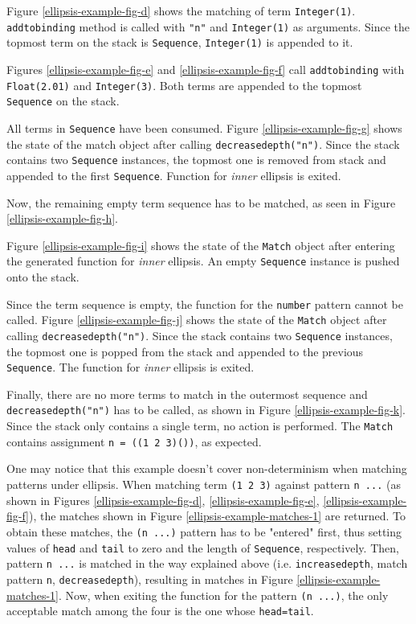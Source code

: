 Figure \ref{ellipsis-example-fig-d} shows the matching of term \texttt{Integer(1)}. \texttt{addtobinding} method is called with \texttt{"n"} and \texttt{Integer(1)} as arguments. Since the topmost term on the stack is \texttt{Sequence}, \texttt{Integer(1)} is appended to it.

Figures \ref{ellipsis-example-fig-e} and \ref{ellipsis-example-fig-f} call \texttt{addtobinding} with \texttt{Float(2.01)} and \texttt{Integer(3)}. Both terms are appended to the topmost \texttt{Sequence} on the stack.

All terms in \texttt{Sequence} have been consumed. Figure \ref{ellipsis-example-fig-g} shows the state of the match object after calling \texttt{decreasedepth("n")}. Since the stack contains two \texttt{Sequence} instances, the topmost one is removed from stack and appended to the first \texttt{Sequence}. Function for \textit{inner} ellipsis is exited.

Now, the remaining empty term sequence has to be matched, as seen in Figure \ref{ellipsis-example-fig-h}.

Figure \ref{ellipsis-example-fig-i} shows the state of the \texttt{Match} object after entering the generated function for \textit{inner} ellipsis. An empty \texttt{Sequence} instance is pushed onto the stack.

Since the term sequence is empty, the function for the \texttt{number} pattern cannot be called. Figure \ref{ellipsis-example-fig-j} shows the state of the \texttt{Match} object after calling \texttt{decreasedepth("n")}. Since the stack contains two \texttt{Sequence} instances, the topmost one is popped from the stack and appended to the previous \texttt{Sequence}. The function for \textit{inner} ellipsis is exited.

Finally, there are no more terms to match in the outermost sequence and \texttt{decreasedepth("n")} has to be called, as shown in Figure \ref{ellipsis-example-fig-k}. Since the stack only contains a single term, no action is performed. The \texttt{Match} contains assignment \texttt{n = ((1 2 3)())}, as expected.

One may notice that this example doesn't cover non-determinism when matching patterns under ellipsis. When matching term \texttt{(1 2 3)} against pattern \texttt{n ...} (as shown in Figures \ref{ellipsis-example-fig-d}, \ref{ellipsis-example-fig-e}, \ref{ellipsis-example-fig-f}), the matches shown in Figure \ref{ellipsis-example-matches-1} are returned. To obtain these matches, the \texttt{(n ...)} pattern has to be "entered" first, thus setting values of \texttt{head} and \texttt{tail} to zero and the length of \texttt{Sequence}, respectively. Then, pattern \texttt{n ...} is matched in the way explained above (i.e. \texttt{increasedepth}, match pattern \texttt{n}, \texttt{decreasedepth}), resulting in matches in Figure \ref{ellipsis-example-matches-1}.  Now, when exiting the function for the pattern \texttt{(n ...)}, the only acceptable match among the four is the one whose \texttt{head=tail}.

